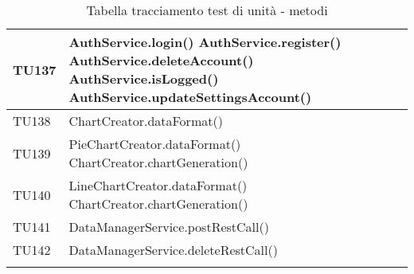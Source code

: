 \begin{center}
\begin{longtable}{| p{3cm} | p{9.5cm} |}
					\hline
					TU137 & AuthService.login() \newline
					AuthService.register() \newline
					AuthService.deleteAccount() \newline
					AuthService.isLogged() \newline
					AuthService.updateSettingsAccount() \\
					\hline
					TU138 & ChartCreator.dataFormat() \\
					\hline
					TU139 & PieChartCreator.dataFormat() \newline
					ChartCreator.chartGeneration() \\
					\hline
					TU140 & LineChartCreator.dataFormat() \newline
					ChartCreator.chartGeneration() \\
					\hline
					TU141 & DataManagerService.postRestCall() \\
					\hline
					TU142 & DataManagerService.deleteRestCall() \\
					\hline
			\caption{Tabella tracciamento test di unità - metodi}
			\end{longtable}
			\egroup
			\end{center}
			
	\pagebreak